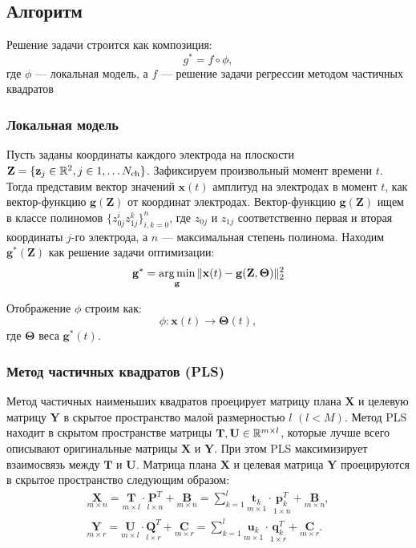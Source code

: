 \documentclass[12pt, twoside]{article}
\begin{document}
\subsection{Алгоритм}
Решение задачи строится как композиция:
\[
	g^* =  f \circ \phi,
\]
где $\phi$ --- локальная модель, а $f$ --- решение задачи регрессии методом частичных квадратов
\subsubsection{Локальная модель}
Пусть заданы координаты каждого электрода на плоскости $\mathbf{Z} = \{\mathbf{z}_j \in \mathbb{R}^2, j \in {1, \ldots N_\text{ch}} \}$. Зафиксируем произвольный момент времени $t$. Тогда представим вектор значений $\mathbf{x}(t)$ амплитуд на электродах в момент $t$, как вектор-функцию $\mathbf{g}(\mathbf{Z})$ от координат электродах. Вектор-функцию $\mathbf{g}(\mathbf{Z})$ ищем в классе полиномов $\{z_{0j}^iz_{1j}^k\}_{i,k = 0}^{n}$, где $z_{0j}$ и $z_{1j}$ соответственно первая и вторая координаты $j$-го электрода, а $n$ --- максимальная степень полинома. Находим $\mathbf{g^*}(\mathbf{Z})$ как решение задачи оптимизации:
\[
\mathbf{g^*} = \argmin_{\mathbf{g}} \|\mathbf{x}(t) - \mathbf{g}(\mathbf{Z}, \mathbf{\Theta})\|_2^2
\]

Отображение $\phi$ строим как: 
\[
	\phi: \mathbf{x}(t) \rightarrow \pmb{\Theta}(t), 
\] где $\pmb{\Theta}$ веса $\mathbf{g^*}(t).$
\subsubsection{Метод частичных квадратов (PLS)}

Метод частичных наименьших квадратов проецирует матрицу плана $\mathbf{X}$ и целевую
 матрицу $\mathbf{Y}$ в скрытое пространство малой размерностью $l$ $(l < M)$. Метод PLS находит в скрытом пространстве матрицы $\mathbf{T}, \mathbf{U} \in \RR
^{m\times l}$, которые лучше всего описывают оригинальные матрицы $\mathbf{X}$ и $\mathbf{Y}$. При этом PLS максимизирует взаимосвязь между $\mathbf{T}$ и $\mathbf{U}$.
Матрица плана $\mathbf{X}$ и целевая матрица $\mathbf{Y}$ проецируются в скрытое пространство следующим образом:
\begin{equation*}
\begin{split}
\underset{m\times n
}{\mathbf{X}}= \underset{m\times l}{\mathbf{T}} \cdot \underset{l\times n
}{\mathbf{P}^T}
+ \underset{m\times n}{\mathbf{B}}
=
\sum_{k=1}^{l}
\underset{m\times 1}{\mathbf{t}_k}
\cdot\underset{1\times n}{\mathbf{p}^T_k}
+ \underset{m\times n}{\mathbf{B}}
, 
\\ 
\underset{m\times r}{\mathbf{Y}}
= \underset{m\times l}{\mathbf{U}} \cdot \underset{l\times r
}{\mathbf{Q}^T}
+ \underset{m\times r
}{\mathbf{C}}= \sum_{k=1}^l
\underset{m\times 1}{\mathbf{u}_k} \cdot \underset{1\times r}{\mathbf{q}^T_k}
+ \underset{m\times r}{\mathbf{C}}.
\end{split}
\end{equation*}
\end{document}
